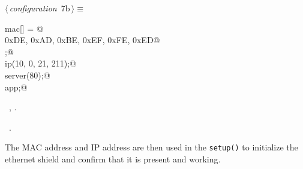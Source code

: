 \documentclass[a4paper, 11pt]{article}
\begin{document}
\begin{flushleft} \small
\begin{minipage}{\linewidth}\label{scrap8}\raggedright\small
{}$\langle\,${\itshape configuration}\nobreak\ {\footnotesize{7b}}$\,\rangle\equiv$
\vspace{-1ex}
\begin{list}{}{\setlength{\leftmargin}{1em}} \item
\mbox{}\lstinline@byte mac[] = {@\\
\mbox{}\lstinline@  0xDE, 0xAD, 0xBE, 0xEF, 0xFE, 0xED@\\
\mbox{}\lstinline@};@\\
\mbox{}\lstinline@IPAddress ip(10, 0, 21, 211);@\\
\mbox{}\lstinline@EthernetServer server(80);@\\
\mbox{}\lstinline@Application app;@\\
\mbox{}{\NWsep}
\end{list}
\vspace{-1ex}
\vspace{-1ex}
\footnotesize
\begin{list}{}{\setlength{\itemsep}{-\parsep}\setlength{\itemindent}{-\leftmargin}}
\item \NWtxtMacroDefBy\ , .
\item \NWtxtMacroRefIn\ .
\end{list}
\end{minipage}
\end{flushleft}

The MAC address and IP address are then used in the \verb|setup()|
to initialize the ethernet shield
and confirm that it is present and working.
\end{document}
